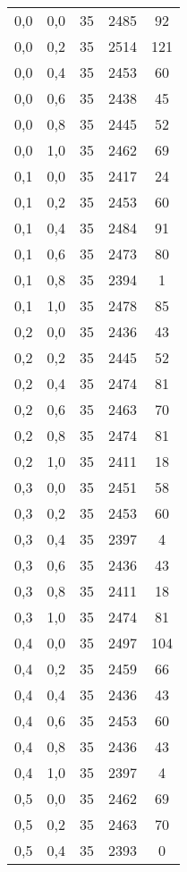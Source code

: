 \begin{center}
\begin{scriptsize}
\begin{longtable}[h]{| c | c | c || c | c |}
			0,0 & 0,0 & 35 & 2485 & 92       \\
			0,0 & 0,2 & 35 & 2514 & 121      \\
			0,0 & 0,4 & 35 & 2453 & 60       \\
			0,0 & 0,6 & 35 & 2438 & 45       \\
			0,0 & 0,8 & 35 & 2445 & 52       \\
			0,0 & 1,0 & 35 & 2462 & 69       \\
			\hline
			0,1 & 0,0 & 35 & 2417 & 24       \\
			0,1 & 0,2 & 35 & 2453 & 60       \\
			0,1 & 0,4 & 35 & 2484 & 91       \\
			0,1 & 0,6 & 35 & 2473 & 80       \\
			0,1 & 0,8 & 35 & 2394 & 1        \\
			0,1 & 1,0 & 35 & 2478 & 85       \\
			\hline
			0,2 & 0,0 & 35 & 2436 & 43       \\
			0,2 & 0,2 & 35 & 2445 & 52       \\
			0,2 & 0,4 & 35 & 2474 & 81       \\
			0,2 & 0,6 & 35 & 2463 & 70       \\
			0,2 & 0,8 & 35 & 2474 & 81       \\
			0,2 & 1,0 & 35 & 2411 & 18       \\
			\hline
			0,3 & 0,0 & 35 & 2451 & 58       \\
			0,3 & 0,2 & 35 & 2453 & 60       \\
			0,3 & 0,4 & 35 & 2397 & 4        \\
			0,3 & 0,6 & 35 & 2436 & 43       \\
			0,3 & 0,8 & 35 & 2411 & 18       \\
			0,3 & 1,0 & 35 & 2474 & 81       \\
			\hline
			0,4 & 0,0 & 35 & 2497 & 104      \\
			0,4 & 0,2 & 35 & 2459 & 66       \\
			0,4 & 0,4 & 35 & 2436 & 43       \\
			0,4 & 0,6 & 35 & 2453 & 60       \\
			0,4 & 0,8 & 35 & 2436 & 43       \\
			0,4 & 1,0 & 35 & 2397 & 4        \\
			\hline
			0,5 & 0,0 & 35 & 2462 & 69       \\
			0,5 & 0,2 & 35 & 2463 & 70       \\
			0,5 & 0,4 & 35 & 2393 & 0        \\

\end{longtable}
\end{scriptsize}
\end{center}
